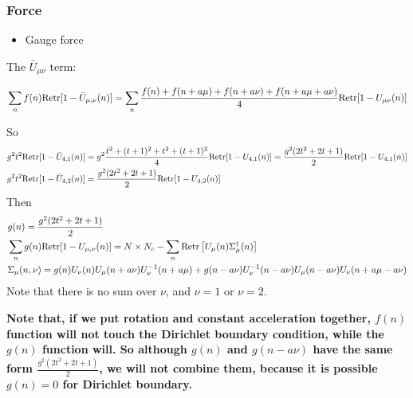 \subsubsection{\label{sec:forceAcceleration}Force}

\begin{itemize}
  \item Gauge force
\end{itemize}

The $\bar{U}_{\mu\nu}$ term:

\begin{equation}
\begin{split}
&\sum _n f(n){\rm Retr}[1-\bar{U}_{\mu, \nu}(n)]=\sum _n\frac{f(n)+f(n+a\mu)+f(n+a\nu)+f(n+a\mu+a\nu)}{4}{\rm Retr}[1-U_{\mu\nu}(n)]\\
\end{split}
\end{equation}

So
\begin{equation}
\begin{split}
&g^2 t^2 {\rm Retr}[1-\bar{U}_{4,1}(n)]=g^2\frac{t^2 + (t+1)^2 + t^2 + (t+1)^2}{4}{\rm Retr}[1-U_{4,1}(n)]=\frac{g^2(2t^2+2t+1)}{2}{\rm Retr}[1-U_{4,1}(n)]\\
&g^2 t^2 {\rm Retr}[1-\bar{U}_{4,2}(n)]=\frac{g^2(2t^2+2t+1)}{2}{\rm Retr}[1-U_{4,2}(n)]\\
\end{split}
\end{equation}
Then
\begin{equation}
\begin{split}
&g(n)=\frac{g^2(2t^2+2t+1)}{2}\\
&\sum _ng(n){\rm Retr}[1-U_{\mu,\nu}(n)]=N\times N_c-\sum _n {\rm Retr}\left[U_{\mu}(n)\Sigma ^{\dagger}_{\mu}(n)\right]\\
&\Sigma _{\mu}(n,\nu)=g(n)U_{\nu}(n)U_{\mu}(n+a\nu)U^{-1}_{\nu}(n+a\mu)+g(n-a\nu)U^{-1}_{\nu}(n-a\nu)U_{\mu}(n-a\nu)U_{\nu}(n+a\mu-a\nu)\\
\end{split}
\end{equation}
Note that there is no sum over $\nu$, and $\nu=1$ or $\nu=2$.

\textcolor[rgb]{1,0,0}{\textbf{Note that, if we put rotation and constant acceleration together, $f(n)$ function will not touch the Dirichlet boundary condition, while the $g(n)$ function will. So although $g(n)$ and $g(n-a\nu)$ have the same form $\frac{g^2(2t^2+2t+1)}{2}$, we will not combine them, because it is possible $g(n)=0$ for Dirichlet boundary.}}

